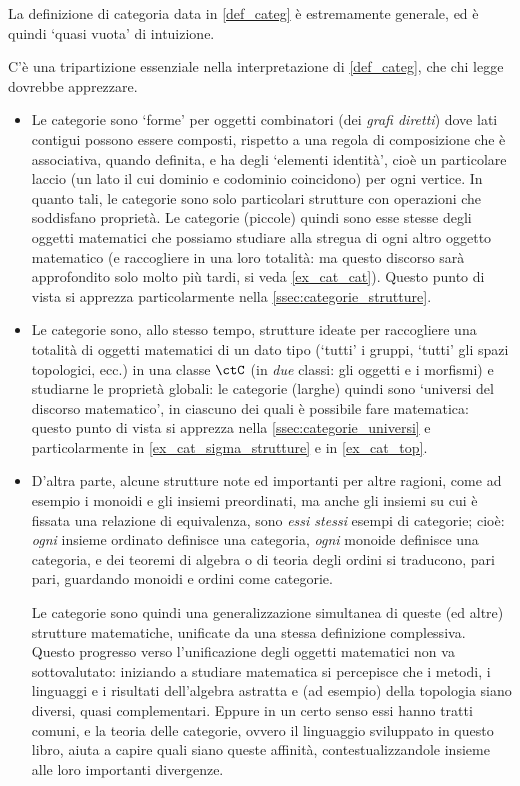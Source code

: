 La definizione di categoria data in \ref{def_categ} è estremamente generale, ed è quindi `quasi vuota' di intuizione.

C'è una tripartizione essenziale nella interpretazione di \ref{def_categ}, che chi legge dovrebbe apprezzare.
\begin{itemize}
	\item Le categorie sono `forme' per oggetti combinatori (dei \emph{grafi diretti}) dove lati contigui possono essere composti, rispetto a una regola di composizione che è associativa, quando definita, e ha degli `elementi identità', cioè un particolare laccio (un lato il cui dominio e codominio coincidono) per ogni vertice. In quanto tali, le categorie sono solo particolari strutture con operazioni che soddisfano proprietà. Le categorie (piccole) quindi sono esse stesse degli oggetti matematici che possiamo studiare alla stregua di ogni altro oggetto matematico (e raccogliere in una loro totalità: ma questo discorso sarà approfondito solo molto più tardi, si veda \ref{ex_cat_cat}). Questo punto di vista si apprezza particolarmente nella \autoref{ssec:categorie_strutture}.
	\item Le categorie sono, allo stesso tempo, strutture ideate per raccogliere una totalità di oggetti matematici di un dato tipo (`tutti' i gruppi, `tutti' gli spazi topologici, ecc.) in una classe \(\ctC\) (in \emph{due} classi: gli oggetti e i morfismi) e studiarne le proprietà globali: le categorie (larghe) quindi sono `universi del discorso matematico', in ciascuno dei quali è possibile fare matematica: questo punto di vista si apprezza nella \autoref{ssec:categorie_universi} e particolarmente in \ref{ex_cat_sigma_strutture} e in \ref{ex_cat_top}.
	\item D'altra parte, alcune strutture note ed importanti per altre ragioni, come ad esempio i monoidi e gli insiemi preordinati, ma anche gli insiemi su cui è fissata una relazione di equivalenza, sono \emph{essi stessi} esempi di categorie; cioè: \emph{ogni} insieme ordinato definisce una categoria, \emph{ogni} monoide definisce una categoria, e dei teoremi di algebra o di teoria degli ordini si traducono, pari pari, guardando monoidi e ordini come categorie.

	      Le categorie sono quindi una generalizzazione simultanea di queste (ed altre) strutture matematiche, unificate da una stessa definizione complessiva. Questo progresso verso l'unificazione degli oggetti matematici non va sottovalutato: iniziando a studiare matematica si percepisce che i metodi, i linguaggi e i risultati dell'algebra astratta e (ad esempio) della topologia siano diversi, quasi complementari. Eppure in un certo senso essi hanno tratti comuni, e la teoria delle categorie, ovvero il linguaggio sviluppato in questo libro, aiuta a capire quali siano queste affinità, contestualizzandole insieme alle loro importanti divergenze.
\end{itemize}
